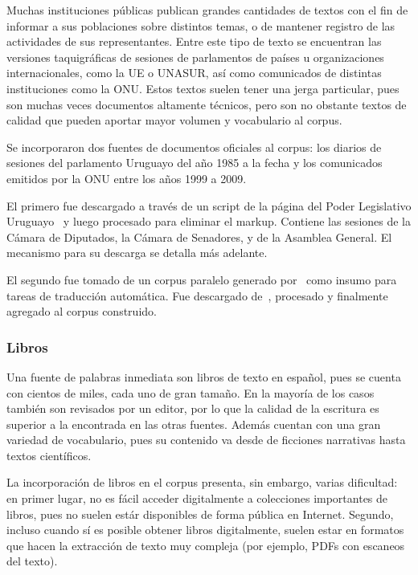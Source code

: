 Muchas instituciones públicas publican grandes cantidades de textos con el fin de informar a sus
poblaciones sobre distintos temas, o de mantener registro de las actividades de sus
representantes. Entre este tipo de texto se encuentran las versiones taquigráficas de sesiones de
parlamentos de países u organizaciones internacionales, como la UE o UNASUR, así como comunicados de
distintas instituciones como la ONU\@. Estos textos suelen tener una jerga particular, pues son
muchas veces documentos altamente técnicos, pero son no obstante textos de calidad que pueden
aportar mayor volumen y vocabulario al corpus.

Se incorporaron dos fuentes de documentos oficiales al corpus: los diarios de sesiones del
parlamento Uruguayo del año 1985 a la fecha y los comunicados emitidos por la ONU entre los años
1999 a 2009.

El primero fue descargado a través de un script de la página del Poder Legislativo
Uruguayo~\cite{ParlamentoUruguay} y luego procesado para eliminar el markup. Contiene las sesiones
de la Cámara de Diputados, la Cámara de Senadores, y de la Asamblea General. El mecanismo para su
descarga se detalla más adelante.

El segundo fue tomado de un corpus paralelo generado por~\cite{Eisele2010} como insumo para tareas
de traducción automática. Fue descargado de~\cite{MultiUNDownload}, procesado y finalmente agregado
al corpus construido.


\subsubsection{Libros}

Una fuente de palabras inmediata son libros de texto en español, pues se cuenta con cientos de
miles, cada uno de gran tamaño. En la mayoría de los casos también son revisados por un editor, por
lo que la calidad de la escritura es superior a la encontrada en las otras fuentes. Además cuentan
con una gran variedad de vocabulario, pues su contenido va desde de ficciones narrativas hasta
textos científicos.

La incorporación de libros en el corpus presenta, sin embargo, varias dificultad: en primer lugar,
no es fácil acceder digitalmente a colecciones importantes de libros, pues no suelen estár disponibles
de forma pública en Internet. Segundo, incluso cuando sí es posible obtener libros
digitalmente, suelen estar en formatos que hacen la extracción de texto muy compleja (por ejemplo,
PDFs con escaneos del texto).

